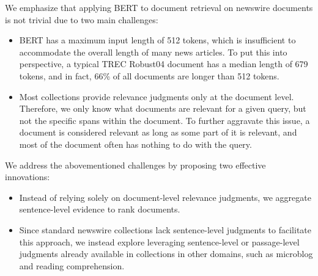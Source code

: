 We emphasize that applying BERT to document retrieval on newswire documents is not trivial due to two main challenges:\

\begin{itemize}
	\item
	BERT has a maximum input length of 512 tokens, which is insufficient to accommodate the overall length of many news articles.
	To put this into perspective, a typical TREC Robust04 document has a median length of 679 tokens, and in fact, 66\% of all documents are longer than 512 tokens.
	\item
	Most collections provide relevance judgments only at the document level.
	Therefore, we only know what documents are relevant for a given query, but not the specific spans within the document.
	To further aggravate this issue, a document is considered relevant as long as some part of it is relevant, and most of the document often has nothing to do with the query.
\end{itemize}


We address the abovementioned challenges by proposing two effective innovations:\

\begin{itemize}
	\item
	Instead of relying solely on document-level relevance judgments, we aggregate sentence-level evidence to rank documents.
	\item
	Since standard newswire collections lack sentence-level judgments to facilitate this approach, we instead explore leveraging sentence-level or passage-level judgments already available in collections in other domains, such as microblog and reading comprehension.
\end{itemize}


